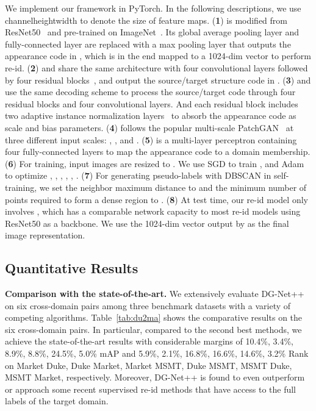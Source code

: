 \documentclass[runningheads]{llncs}
\begin{document}
We implement our framework in PyTorch. In the following descriptions, we use channelheightwidth to denote the size of feature maps. 
(\textbf{1})  is modified from ResNet50~\cite{he2016deep} and  pre-trained on ImageNet~\cite{imagenet}. Its global average pooling layer and fully-connected layer are replaced with a max pooling layer that outputs the appearance code  in , which is in the end mapped to a 1024-dim vector to perform re-id. (\textbf{2})  and  share the same architecture with four convolutional layers followed by four residual blocks~\cite{he2016deep}, and output the source/target structure code  in . (\textbf{3})  and  use the same decoding scheme to process the source/target code  through four residual blocks and four convolutional layers. And each residual block includes two adaptive instance normalization layers~\cite{huang2017arbitrary} to absorb the appearance code  as scale and bias parameters. (\textbf{4})  follows the popular multi-scale PatchGAN~\cite{isola2017image} at three different input scales: , , and . (\textbf{5})  is a multi-layer perceptron containing four fully-connected layers to map the appearance code  to a domain membership. 
(\textbf{6}) For training, input images are resized to . We use SGD to train , and Adam~\cite{kingma2014adam} to optimize , , , , , . (\textbf{7}) For generating pseudo-labels with DBSCAN in self-training, we set the neighbor maximum distance to  and the minimum number of points required to form a dense region to . (\textbf{8}) At test time, our re-id model only involves , which has a comparable network capacity to most re-id models using ResNet50 as a backbone. We use the 1024-dim vector output by  as the final image representation. 




\subsection{Quantitative Results}
\noindent\textbf{Comparison with the state-of-the-art.} We extensively evaluate DG-Net++ on six cross-domain pairs among three benchmark datasets with a variety of competing algorithms. Table~\ref{tab:du2ma} shows the comparative results on the six cross-domain pairs. In particular, compared to the second best methods, we achieve the state-of-the-art results with considerable margins of 10.4\%, 3.4\%, 8.9\%, 8.8\%, 24.5\%, 5.0\% mAP and 5.9\%, 2.1\%, 16.8\%, 16.6\%, 14.6\%, 3.2\% Rank on Market  Duke, Duke  Market, Market  MSMT, Duke  MSMT, MSMT  Duke, MSMT  Market, respectively. Moreover, DG-Net++ is found to even outperform or approach some recent supervised re-id methods \cite{huang2018multi,liu2018pose,sun2017svdnet,unlabeld-samples,zheng2018pedestrian} that have access to the full labels of the target domain. 
\end{document}
